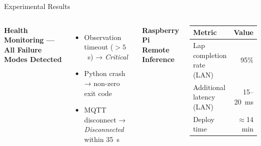\documentclass[aspectratio=169,9pt]{beamer}
\begin{document}
\begin{frame}{Experimental Results}
\begin{columns}[T]
      \vspace{0.2em}
      \textbf{Health Monitoring — All Failure Modes Detected}
      \begin{itemize}\setlength\itemsep{1pt}
        \item Observation timeout ($>5$~s) → \textit{Critical}
        \item Python crash → non-zero exit code
        \item MQTT disconnect → \textit{Disconnected} within 35~s
      \end{itemize}

      \vspace{0.2em}
      \textbf{Raspberry Pi Remote Inference}
      \begin{center}
        \small
        \begin{tabular}{lr}
          \toprule
          Metric & Value \\
          \midrule
          \alert{Lap completion rate (LAN)} & \alert{95\%} \\
          Additional latency (LAN) & 15–20~ms \\
          Deploy time              & $\approx$14 min \\
          \bottomrule
        \end{tabular}
      \end{center}
  \end{columns}
\end{frame}
\end{document}
